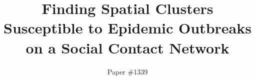 \documentclass[sigconf]{aamas}  %
\begin{document}
\title{Finding Spatial Clusters Susceptible to Epidemic Outbreaks on a Social Contact Network}


\author{Paper \#1339}  %

%
%
%
%
%
%
%
%
\end{document}
